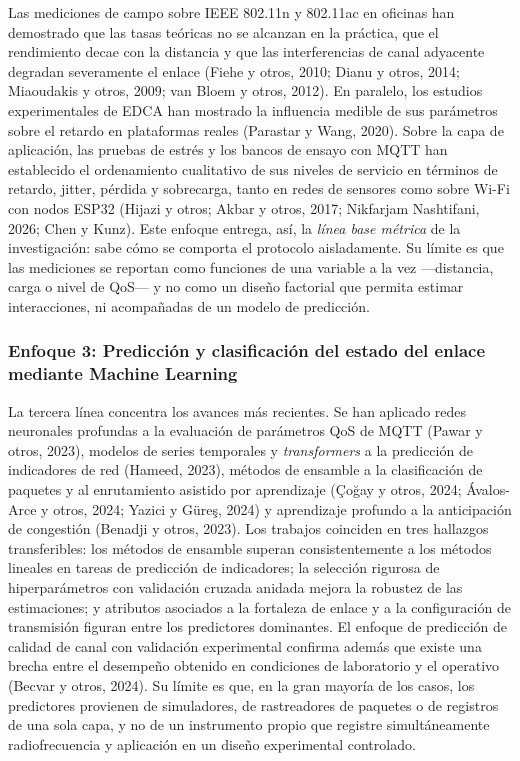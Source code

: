 \documentclass[
  12pt,
]{article}
\begin{document}
Las mediciones de campo sobre IEEE 802.11n y 802.11ac en oficinas han
demostrado que las tasas teóricas no se alcanzan en la práctica, que el
rendimiento decae con la distancia y que las interferencias de canal
adyacente degradan severamente el enlace (Fiehe y otros, 2010; Dianu y
otros, 2014; Miaoudakis y otros, 2009; van Bloem y otros, 2012). En
paralelo, los estudios experimentales de EDCA han mostrado la influencia
medible de sus parámetros sobre el retardo en plataformas reales
(Parastar y Wang, 2020). Sobre la capa de aplicación, las pruebas de
estrés y los bancos de ensayo con MQTT han establecido el ordenamiento
cualitativo de sus niveles de servicio en términos de retardo, jitter,
pérdida y sobrecarga, tanto en redes de sensores como sobre Wi-Fi con
nodos ESP32 (Hijazi y otros; Akbar y otros, 2017; Nikfarjam Nashtifani,
2026; Chen y Kunz). Este enfoque entrega, así, la \emph{línea base
métrica} de la investigación: sabe cómo se comporta el protocolo
aisladamente. Su límite es que las mediciones se reportan como funciones
de una variable a la vez —distancia, carga o nivel de QoS— y no como un
diseño factorial que permita estimar interacciones, ni acompañadas de un
modelo de predicción.

\subsubsection{Enfoque 3: Predicción y clasificación del estado del
enlace mediante Machine
Learning}\label{enfoque-3-predicciuxf3n-y-clasificaciuxf3n-del-estado-del-enlace-mediante-machine-learning}

La tercera línea concentra los avances más recientes. Se han aplicado
redes neuronales profundas a la evaluación de parámetros QoS de MQTT
(Pawar y otros, 2023), modelos de series temporales y
\emph{transformers} a la predicción de indicadores de red (Hameed,
2023), métodos de ensamble a la clasificación de paquetes y al
enrutamiento asistido por aprendizaje (Çoğay y otros, 2024; Ávalos-Arce
y otros, 2024; Yazici y Güreş, 2024) y aprendizaje profundo a la
anticipación de congestión (Benadji y otros, 2023). Los trabajos
coinciden en tres hallazgos transferibles: los métodos de ensamble
superan consistentemente a los métodos lineales en tareas de predicción
de indicadores; la selección rigurosa de hiperparámetros con validación
cruzada anidada mejora la robustez de las estimaciones; y atributos
asociados a la fortaleza de enlace y a la configuración de transmisión
figuran entre los predictores dominantes. El enfoque de predicción de
calidad de canal con validación experimental confirma además que existe
una brecha entre el desempeño obtenido en condiciones de laboratorio y
el operativo (Becvar y otros, 2024). Su límite es que, en la gran
mayoría de los casos, los predictores provienen de simuladores, de
rastreadores de paquetes o de registros de una sola capa, y no de un
instrumento propio que registre simultáneamente radiofrecuencia y
aplicación en un diseño experimental controlado.
\end{document}
